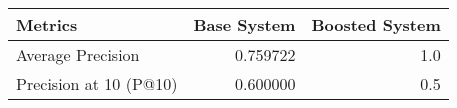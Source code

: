 \begin{tabular}{lrr}
\toprule
               Metrics &  Base System &  Boosted System \\
\midrule
     Average Precision &     0.759722 &             1.0 \\
Precision at 10 (P@10) &     0.600000 &             0.5 \\
\bottomrule
\end{tabular}
